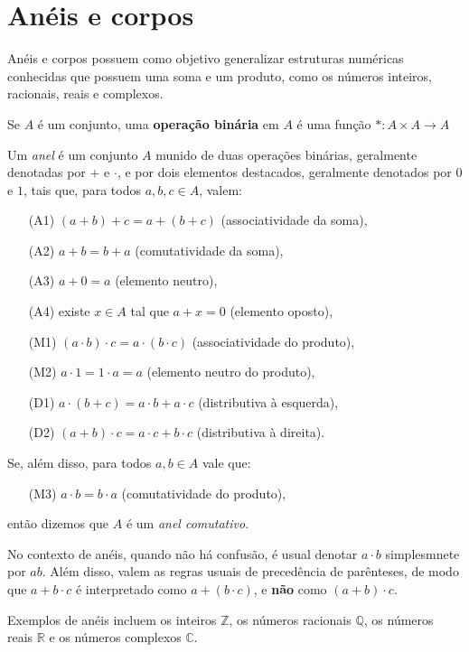 \section{Anéis e corpos}

Anéis e corpos possuem como objetivo generalizar estruturas numéricas conhecidas que possuem uma soma e um produto, como os números inteiros, racionais, reais e complexos.

Se $A$ é um conjunto, uma \textbf{operação binária} em $A$ é uma função $*: A \times A \to A$ 
\begin{definition}
Um \emph{anel}  é um conjunto $A$ munido de duas operações binárias, geralmente denotadas por $+$ e $\cdot$, e por dois elementos destacados, geralmente denotados por $0$ e $1$, tais que, para todos $a, b, c \in A$, valem:
\begin{itemize}
    \item[(A1)] $(a+b)+c = a+(b+c)$ (associatividade da soma),
    \item[(A2)] $a+b = b+a$ (comutatividade da soma),
    \item[(A3)] $a+0=a$ (elemento neutro),
    \item[(A4)] existe $x \in A$ tal que $a+x=0$ (elemento oposto),
    \item[(M1)] $(a\cdot b)\cdot c = a\cdot(b\cdot c)$ (associatividade do produto),
    \item[(M2)] $a\cdot 1=1\cdot a=a$ (elemento neutro do produto),
    \item[(D1)] $a\cdot(b+c)=a\cdot b+a\cdot c$ (distributiva à esquerda),
    \item[(D2)] $(a+b)\cdot c=a\cdot c+b\cdot c$ (distributiva à direita).
\end{itemize}

Se, além disso, para todos $a, b \in A$ vale que:
\begin{itemize}
    \item[(M3)] $a\cdot b = b\cdot a$ (comutatividade do produto),
\end{itemize}
então dizemos que $A$ é um \emph{anel comutativo}.
\end{definition}

No contexto de anéis, quando não há confusão, é usual denotar $a\cdot b$ simplesmnete por $ab$.
Além disso, valem as regras usuais de precedência de parênteses, de modo que $a+b\cdot c$ é interpretado como $a+(b\cdot c)$, e \textbf{não} como $(a+b)\cdot c$.

Exemplos de anéis incluem os inteiros $\mathbb{Z}$, os números racionais $\mathbb{Q}$, os números reais $\mathbb{R}$ e os números complexos $\mathbb{C}$.

